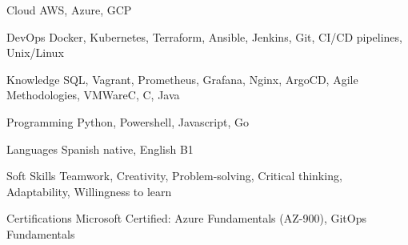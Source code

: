 

\begin{cvskills}

  \cvskill
    {Cloud} %
    {AWS, Azure, GCP} %

  \cvskill
    {DevOps} %
    {Docker, Kubernetes, Terraform, Ansible, Jenkins, Git, CI/CD pipelines,  Unix/Linux} %

  \cvskill
    {Knowledge} %
    {SQL, Vagrant, Prometheus, Grafana, Nginx, ArgoCD, Agile Methodologies, VMWareC, C, Java} %

  \cvskill
    {Programming} %
    {Python, Powershell, Javascript, Go} %

  \cvskill
    {Languages} %
    {Spanish native, English B1} %

  \cvskill
    {Soft Skills} %
    {Teamwork, Creativity, Problem-solving, Critical thinking, Adaptability, Willingness to learn} %

  \cvskill
    {Certifications} %
    {Microsoft Certified: Azure Fundamentals (AZ-900), GitOps Fundamentals} %
\end{cvskills}